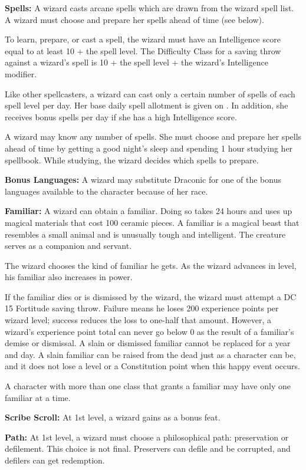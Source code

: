 \textbf{Spells:} A wizard casts arcane spells which are drawn from the wizard spell list. A wizard must choose and prepare her spells ahead of time (see below).

To learn, prepare, or cast a spell, the wizard must have an Intelligence score equal to at least 10 + the spell level. The Difficulty Class for a saving throw against a wizard's spell is 10 + the spell level + the wizard's Intelligence modifier.

Like other spellcasters, a wizard can cast only a certain number of spells of each spell level per day. Her base daily spell allotment is given on . In addition, she receives bonus spells per day if she has a high Intelligence score.

A wizard may know any number of spells. She must choose and prepare her spells ahead of time by getting a good night's sleep and spending 1 hour studying her spellbook. While studying, the wizard decides which spells to prepare.

\textbf{Bonus Languages:} A wizard may substitute Draconic for one of the bonus languages available to the character because of her race.

\textbf{Familiar:} A wizard can obtain a familiar. Doing so takes 24 hours and uses up magical materials that cost 100 ceramic pieces. A familiar is a magical beast that resembles a small animal and is unusually tough and intelligent. The creature serves as a companion and servant.

The wizard chooses the kind of familiar he gets. As the wizard advances in level, his familiar also increases in power.

If the familiar dies or is dismissed by the wizard, the wizard must attempt a DC 15 Fortitude saving throw. Failure means he loses 200 experience points per wizard level; success reduces the loss to one-half that amount. However, a wizard's experience point total can never go below 0 as the result of a familiar's demise or dismissal. A slain or dismissed familiar cannot be replaced for a year and day. A slain familiar can be raised from the dead just as a character can be, and it does not lose a level or a Constitution point when this happy event occurs.

A character with more than one class that grants a familiar may have only one familiar at a time.

\textbf{Scribe Scroll:} At 1st level, a wizard gains  as a bonus feat.

\textbf{Path:} At 1st level, a wizard must choose a philosophical path: preservation or defilement. This choice is not final. Preservers can defile and be corrupted, and defilers can get redemption.

